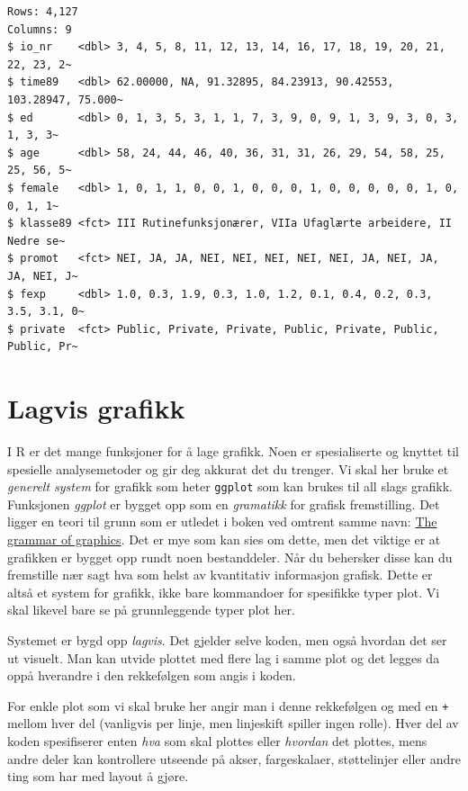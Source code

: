 \documentclass[
  norsk,
  letterpaper,
  DIV=11,
  numbers=noendperiod]{scrreprt}
\theoremstyle{definition}
\theoremstyle{remark}
\begin{document}
\begin{verbatim}
Rows: 4,127
Columns: 9
$ io_nr    <dbl> 3, 4, 5, 8, 11, 12, 13, 14, 16, 17, 18, 19, 20, 21, 22, 23, 2~
$ time89   <dbl> 62.00000, NA, 91.32895, 84.23913, 90.42553, 103.28947, 75.000~
$ ed       <dbl> 0, 1, 3, 5, 3, 1, 1, 7, 3, 9, 0, 9, 1, 3, 9, 3, 0, 3, 1, 3, 3~
$ age      <dbl> 58, 24, 44, 46, 40, 36, 31, 31, 26, 29, 54, 58, 25, 25, 56, 5~
$ female   <dbl> 1, 0, 1, 1, 0, 0, 1, 0, 0, 0, 1, 0, 0, 0, 0, 0, 1, 0, 0, 1, 1~
$ klasse89 <fct> III Rutinefunksjonærer, VIIa Ufaglærte arbeidere, II Nedre se~
$ promot   <fct> NEI, JA, JA, NEI, NEI, NEI, NEI, NEI, JA, NEI, JA, JA, NEI, J~
$ fexp     <dbl> 1.0, 0.3, 1.9, 0.3, 1.0, 1.2, 0.1, 0.4, 0.2, 0.3, 3.5, 3.1, 0~
$ private  <fct> Public, Private, Private, Public, Private, Public, Public, Pr~
\end{verbatim}

\section{Lagvis grafikk}\label{lagvis-grafikk}

I R er det mange funksjoner for å lage grafikk. Noen er spesialiserte og
knyttet til spesielle analysemetoder og gir deg akkurat det du trenger.
Vi skal her bruke et \emph{generelt system} for grafikk som heter
\texttt{ggplot} som kan brukes til all slags grafikk. Funksjonen
\emph{ggplot} er bygget opp som en \emph{gramatikk} for grafisk
fremstilling. Det ligger en teori til grunn som er utledet i boken ved
omtrent samme navn:
\href{https://link.springer.com/book/10.1007/0-387-28695-0}{The grammar
of graphics}. Det er mye som kan sies om dette, men det viktige er at
grafikken er bygget opp rundt noen bestanddeler. Når du behersker disse
kan du fremstille nær sagt hva som helst av kvantitativ informasjon
grafisk. Dette er altså et system for grafikk, ikke bare kommandoer for
spesifikke typer plot. Vi skal likevel bare se på grunnleggende typer
plot her.

Systemet er bygd opp \emph{lagvis}. Det gjelder selve koden, men også
hvordan det ser ut visuelt. Man kan utvide plottet med flere lag i samme
plot og det legges da oppå hverandre i den rekkefølgen som angis i
koden.

For enkle plot som vi skal bruke her angir man i denne rekkefølgen og
med en \texttt{+} mellom hver del (vanligvis per linje, men linjeskift
spiller ingen rolle). Hver del av koden spesifiserer enten \emph{hva}
som skal plottes eller \emph{hvordan} det plottes, mens andre deler kan
kontrollere utseende på akser, fargeskalaer, støttelinjer eller andre
ting som har med layout å gjøre.
\end{document}
